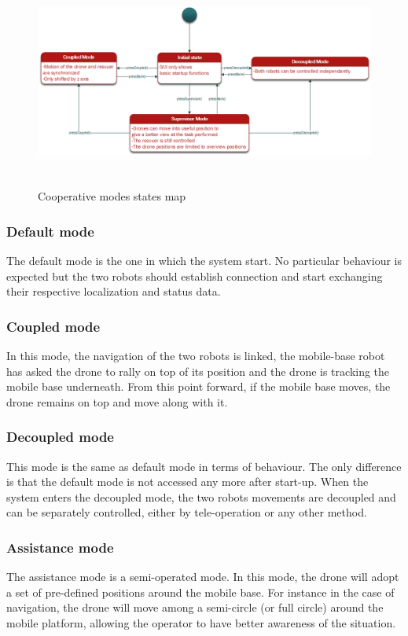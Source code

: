 \documentclass[11pt,a4paper]{article}
\begin{document}
\begin{figure}[h]	
\includegraphics[height=7cm]{cooperativeModes.png}
\caption{Cooperative modes states map}
\end{figure}

\subsubsection{Default mode}
The default mode is the one in which the system start. No particular behaviour is expected but the two
robots should establish connection and start exchanging their respective localization and status data.

\subsubsection{Coupled mode}
In this mode, the navigation of the two robots is linked, the mobile-base robot has asked the drone to 
rally on top of its position and the drone is tracking the mobile base underneath. From this point forward, if the mobile base moves, the drone remains on top and move along with it.

\subsubsection{Decoupled mode}
This mode is the same as default mode in terms of behaviour. The only difference is that the default mode
is not accessed any more after start-up. When the system enters the decoupled mode, the two robots movements
are decoupled and can be separately controlled, either by tele-operation or any other method.

\subsubsection{Assistance mode}
The assistance mode is a semi-operated mode. In this mode, the drone will adopt a set of pre-defined
positions around the mobile base. For instance in the case of navigation, the drone will move 
among a semi-circle (or full circle) around the mobile platform, allowing the 
operator to have better awareness of the situation.
\end{document}

